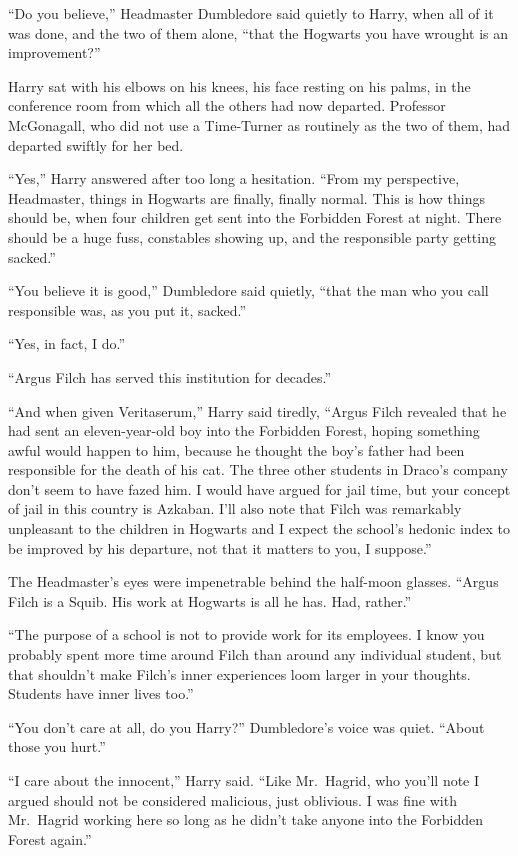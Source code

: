 ``Do you believe,'' Headmaster Dumbledore said quietly to Harry, when
all of it was done, and the two of them alone, ``that the Hogwarts you
have wrought is an improvement?''

Harry sat with his elbows on his knees, his face resting on his palms,
in the conference room from which all the others had now departed.
Professor McGonagall, who did not use a Time-Turner as routinely as the
two of them, had departed swiftly for her bed.

``Yes,'' Harry answered after too long a hesitation. ``From my
perspective, Headmaster, things in Hogwarts are finally, finally normal.
This is how things should be, when four children get sent into the
Forbidden Forest at night. There should be a huge fuss, constables
showing up, and the responsible party getting sacked.''

``You believe it is good,'' Dumbledore said quietly, ``that the man who
you call responsible was, as you put it, sacked.''

``Yes, in fact, I do.''

``Argus Filch has served this institution for decades.''

``And when given Veritaserum,'' Harry said tiredly, ``Argus Filch
revealed that he had sent an eleven-year-old boy into the Forbidden
Forest, hoping something awful would happen to him, because he thought
the boy's father had been responsible for the death of his cat. The
three other students in Draco's company don't seem to have fazed him. I
would have argued for jail time, but your concept of jail in this
country is Azkaban. I'll also note that Filch was remarkably unpleasant
to the children in Hogwarts and I expect the school's hedonic index to
be improved by his departure, not that it matters to you, I suppose.''

The Headmaster's eyes were impenetrable behind the half-moon glasses.
``Argus Filch is a Squib. His work at Hogwarts is all he has. Had,
rather.''

``The purpose of a school is not to provide work for its employees. I
know you probably spent more time around Filch than around any
individual student, but that shouldn't make Filch's inner experiences
loom larger in your thoughts. Students have inner lives too.''

``You don't care at all, do you Harry?'' Dumbledore's voice was quiet.
``About those you hurt.''

``I care about the innocent,'' Harry said. ``Like Mr.~Hagrid, who you'll
note I argued should not be considered malicious, just oblivious. I was
fine with Mr.~Hagrid working here so long as he didn't take anyone into
the Forbidden Forest again.''


